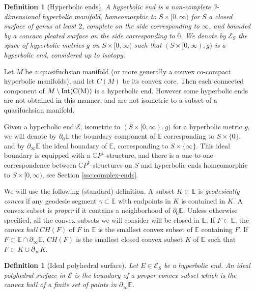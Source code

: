 \documentclass[notitlepage,twoside,a4paper]{amsart}
\newtheorem{definition}[theorem]{\rm\bf Definition}
\theoremstyle{named}
\newcommand{\CP}{{\mathbb CP}}
\newcommand{\bE}{{\mathbb E}}
\newcommand{\cE}{{\mathcal E}}
\begin{document}
\begin{definition}[Hyperbolic ends]
  A {\em hyperbolic end} is a non-complete 3-dimensional hyperbolic manifold, homeomorphic to $S\times [0,\infty)$ for $S$ a closed surface of genus at least $2$, complete on the side corresponding to $\infty$, and bounded by a concave pleated surface on the side corresponding to $0$. 
  We denote by $\cE_S$ the space of hyperbolic metrics $g$ on $S\times [0,\infty)$ such that $(S\times [0,\infty), g)$ is a hyperbolic end, considered up to isotopy.
\end{definition}

Let $M$ be a quasifuchsian manifold (or more generally a convex co-compact hyperbolic manifolds), and let $C(M)$ be its convex core. Then each connected component of $M\setminus \rm{Int}(C(M))$ is a hyperbolic end. However some hyperbolic ends are not obtained in this manner, and are not isometric to a subset of a quasifuchsian manifold.

Given a hyperbolic end $\cE$, isometric to $(S\times [0,\infty), g)$ for a hyperbolic metric $g$, we will denote by $\partial_0\bE$ the boundary component of $\bE$ corresponding to $S\times \{ 0\}$, and by $\partial_\infty \bE$ the ideal boundary of $\bE$, corresponding to $S\times \{ \infty\}$. This ideal boundary is equipped with a $\CP^1$-structure, and there is a one-to-one correspondence between $\CP^1$-structures on $S$ and hyperbolic ends homeomorphic to $S\times [0,\infty)$, see Section \ref{ssc:complex-ends}.

We will use the following (standard) definition. A subset $K\subset \bE$ is {\em geodesically convex} if any geodesic segment $\gamma\subset \bE$ with endpoints in $K$ is contained in $K$. A convex subset is {\em proper} if it contains a neighborhood of $\partial_0\bE$. Unless otherwise specified, all the convex subsets we will consider will be closed in $\bE$. If $F\subset \bE$, the {\em convex hull} $CH(F)$ of $F$ in $\bE$ is the smallest convex subset of $\bE$ containing $F$. If $F\subset \bE\cap \partial_\infty \bE$, $CH(F)$ is the smallest closed convex subset $K$ of $\bE$ such that $F\subset K\cup \partial_\infty K$.

\begin{definition}[Ideal polyhedral surface]
   Let $E\in \cE_S$ be a hyperbolic end. An {\em ideal polyhedral surface} in $\cE$ is the boundary of a proper convex subset which is the convex hull of a finite set of points in $\partial_\infty \bE$.
\end{definition}
\end{document}
